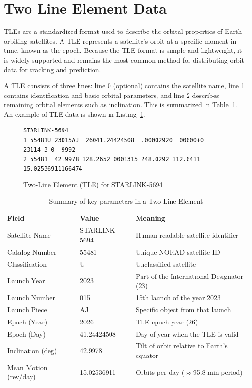 \section{Two Line Element Data}
TLEs are a standardized format used to describe the orbital properties of Earth-orbiting satellites. A TLE represents a satellite's orbit at a specific moment in time, known as the epoch. Because the TLE format is simple and lightweight, it is widely supported and remains the most common method for distributing orbit data for tracking and prediction.

A TLE consists of three lines: line 0 (optional) contains the satellite name, line 1 contains identification and basic orbital parameters, and line 2 describes remaining orbital elements such as inclination. This is summarized in Table~\ref{tab:summaryOfTle}. An example of TLE data is shown in Listing~\ref{fig:tle-starlink-5694}.

\begin{figure}[ht]
\centering
\begin{verbatim}
STARLINK-5694
1 55481U 23015AJ  26041.24424508  .00002920  00000+0  23114-3 0  9992
2 55481  42.9978 128.2652 0001315 248.0292 112.0411 15.02536911166474
\end{verbatim}
\caption{Two-Line Element (TLE) for STARLINK-5694}
\label{fig:tle-starlink-5694}
\end{figure}

\begin{table}[ht]
\caption{Summary of key parameters in a Two-Line Element}
\centering
\small
\renewcommand{\arraystretch}{1.3}
\begin{tabular}{|l|l|p{7.5cm}|}
\hline
\textbf{Field} & \textbf{Value} & \textbf{Meaning} \\ \hline
Satellite Name & STARLINK-5694 & Human-readable satellite identifier \\ \hline
Catalog Number & 55481 & Unique NORAD satellite ID \\ \hline
Classification & U & Unclassified satellite \\ \hline
Launch Year & 2023 & Part of the International Designator (23) \\ \hline
Launch Number & 015 & 15th launch of the year 2023 \\ \hline
Launch Piece & AJ & Specific object from that launch \\ \hline
Epoch (Year) & 2026 & TLE epoch year (26) \\ \hline
Epoch (Day) & 41.24424508 & Day of year when the TLE is valid \\ \hline
Inclination (deg) & 42.9978 & Tilt of orbit relative to Earth's equator \\ \hline
Mean Motion (rev/day) & 15.02536911 & Orbits per day ($\approx$95.8 min period) \\ \hline
\end{tabular}
\label{tab:summaryOfTle}
\end{table}

